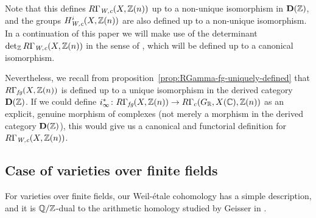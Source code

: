 \documentclass{article}
\numberwithin{equation}{section}
\begin{document}
\begin{remark}
  Note that this defines $R\Gamma_{\text{\it W,c}} (X,\mathbb{Z}(n))$ up to a non-unique isomorphism
  in $\mathbf{D} (\mathbb{Z})$, and the groups $H_{\text{\it W,c}}^i (X, \mathbb{Z} (n))$ are also defined
  up to a non-unique isomorphism. In a continuation of this paper we will make
  use of the determinant $\operatorname{det}\nolimits_{\mathbb{Z}} R\Gamma_{\text{\it W,c}} (X,\mathbb{Z}(n))$ in the
  sense of \cite{Knudsen-Mumford-1976}, which will be defined up to a canonical
  isomorphism.

  Nevertheless, we recall from proposition~\ref{prop:RGamma-fg-uniquely-defined}
  that $R\Gamma_{\text{\it fg}} (X, \mathbb{Z} (n))$ is defined up to a unique isomorphism in the
  derived category $\mathbf{D} (\mathbb{Z})$. If we could define
  $i_\infty^*\colon R\Gamma_{\text{\it fg}} (X, \mathbb{Z}(n)) \to R\Gamma_c (G_{\mathbb{R}}, X(\mathbb{C}), \mathbb{Z}(n))$
  as an explicit, genuine morphism of complexes (not merely a morphism in the
  derived category $\mathbf{D} (\mathbb{Z})$), this would give us a canonical and
  functorial definition for $R\Gamma_{\text{\it W,c}} (X, \mathbb{Z}(n))$.
\end{remark}

\subsection*{Case of varieties over finite fields}

For varieties over finite fields, our Weil-étale cohomology has a simple
description, and it is $\mathbb{Q}/\mathbb{Z}$-dual to the arithmetic homology studied by
Geisser in \cite{Geisser-2010-arithmetic-homology}.
\end{document}
